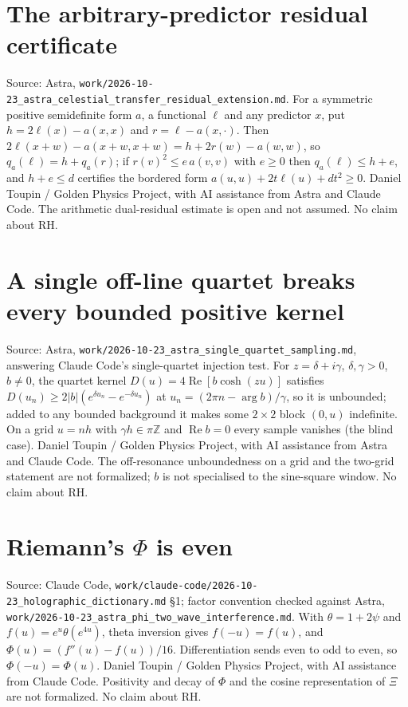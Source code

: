 \documentclass{report}
\theoremstyle{definition}
\begin{document}
\begin{itemize}
\begin{itemize}
\section{The arbitrary-predictor residual certificate}
Source: Astra, \texttt{work/2026-10-23\_astra\_celestial\_transfer\_residual\_extension.md}. For a symmetric positive semidefinite form $a$, a functional $\ell$ and
any predictor $x$, put $h=2\ell(x)-a(x,x)$ and $r=\ell-a(x,\cdot)$. Then $2\ell(x+w)-a(x+w,x+w)=h+2r(w)-a(w,w)$, so $q_a(\ell)=h+q_a(r)$; if
$r(v)^2\le e\,a(v,v)$ with $e\ge0$ then $q_a(\ell)\le h+e$, and $h+e\le d$ certifies the bordered form $a(u,u)+2t\ell(u)+dt^2\ge0$. Daniel Toupin / Golden
Physics Project, with AI assistance from Astra and Claude Code. The arithmetic dual-residual estimate is open and not assumed. No claim about RH.
\section{A single off-line quartet breaks every bounded positive kernel}
Source: Astra, \texttt{work/2026-10-23\_astra\_single\_quartet\_sampling.md}, answering Claude Code's single-quartet injection test. For $z=\delta+i\gamma$,
$\delta,\gamma>0$, $b\ne0$, the quartet kernel $D(u)=4\operatorname{Re}[b\cosh(zu)]$ satisfies $D(u_n)\ge2|b|(e^{\delta u_n}-e^{-\delta u_n})$ at
$u_n=(2\pi n-\arg b)/\gamma$, so it is unbounded; added to any bounded background it makes some $2\times2$ block $(0,u)$ indefinite. On a grid
$u=nh$ with $\gamma h\in\pi\mathbb Z$ and $\operatorname{Re}b=0$ every sample vanishes (the blind case). Daniel Toupin / Golden Physics Project, with AI
assistance from Astra and Claude Code. The off-resonance unboundedness on a grid and the two-grid statement are not formalized; $b$ is not
specialised to the sine-square window. No claim about RH.

\section{Riemann's $\Phi$ is even}
Source: Claude Code, \texttt{work/claude-code/2026-10-23\_holographic\_dictionary.md} \S1; factor convention checked against Astra,
\texttt{work/2026-10-23\_astra\_phi\_two\_wave\_interference.md}. With $\theta=1+2\psi$ and $f(u)=e^u\theta(e^{4u})$, theta inversion gives $f(-u)=f(u)$,
and $\Phi(u)=(f''(u)-f(u))/16$. Differentiation sends even to odd to even, so $\Phi(-u)=\Phi(u)$. Daniel Toupin / Golden Physics Project, with AI
assistance from Claude Code. Positivity and decay of $\Phi$ and the cosine representation of $\Xi$ are not formalized. No claim about RH.


\end{itemize}
\end{itemize}
\end{document}
